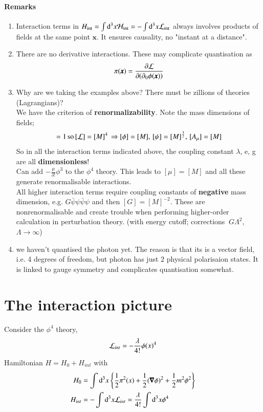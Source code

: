 \paragraph{Remarks}
\begin{enumerate}
	\item Interaction terms in $H_\text{int} = \int \dd^3x \mathcal{H}_\text{int} = - \int\dd^3x\mathcal{L}_\text{int}$ always involves products of fields at the same point $\pmb{x}$. It ensures causality, no "instant at a distance".
	\item There are no derivative interactions. These may complicate quantisation as $$\pi(\pmb{x}) = \frac{\partial\mathcal{L}}{\partial(\partial_0 \phi(\pmb{x}))}$$
	\item Why are we taking the examples above? There must be zillions of theories (Lagrangians)? \\
			We have the criterion of \textbf{renormalizability}. Note the mass dimensions of fields;
			\begin{align*}
				[S] = 1 \, \text{so} \, [\lag] = [M]^4 \, \Rightarrow [\phi] = [M] ,\, [\psi] = [M]^{\frac{3}{2}} ,\, [A_\mu] = [M]
			\end{align*}
			So in all the interaction terms indicated above, the coupling constant $\lambda$, e, g are all \textbf{dimensionless}!\\
			Can add $-\frac{\mu}{3!}\phi^3$ to the $\phi^4$ theory. This leads to $[\mu] = [M]$ and all these generate renormalisable interactions. \\
			All higher interaction terms require coupling constants of \textbf{negative} mass dimension, e.g. $G\bar{\psi}\psi\bar{\psi}\psi$ and then $[G] = [M]^{-2}$. These are nonrenormalisable and create trouble when performing higher-order calculation in perturbation theory.
			(with energy cutoff; corrections $~G\Lambda^2$, $\Lambda \rightarrow \infty$)
		\item we haven't quantised the photon yet. The reason is that its is a vector field, i.e. 4 degrees of freedom, but photon has just $2$ physical polarisaion states. It is linked to gauge symmetry and complicates quantisation somewhat.
\end{enumerate}
\section{The interaction picture}
Consider the $\phi^4$ theory, 
\begin{align}
\mathcal{L}_{int} = -\frac{\lambda}{4!} \phi(x)^4
\end{align}
Hamiltonian $H = H_0 + H_{int}$ with 
\begin{align}
	H_0 &= \int\dd^3 x \left\{ \frac{1}{2}\pi^2(x) + \frac{1}{2}(\pmb{\nabla}\phi)^2 + \frac{1}{2}m^2\phi^2 \right\}\\
	H_{int} &= -\int\dd^3x \mathcal{L}_{int} = \frac{\lambda}{4!}\int\dd^3x \phi^4 
\end{align}

